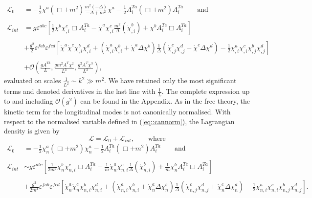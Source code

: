\documentclass{article}
\begin{document}
\begin{equation*}
    \begin{split}
        \mathcal{L}_0&=-\frac{1}{2}\chi^a(\Box+m^2)\frac{m^2(-\Delta)}{-\Delta+m^2}\chi^a-\frac{1}{2}A_i^{Ta}(\Box+m^2)A_i^{Ta}\qquad\text{and}\\\\
        \mathcal{L}_{int}&=g\varepsilon^{abc}\left[\frac{1}{2}\chi^b\chi^c_{,i}\Box A_i^{Ta}-\dot{\chi}^a\chi^{c}_{,i}\frac{m^2}{\Delta}\left(\dot{\chi}^b_{,i}\right)+\chi^bA_i^{Tc}\Box A_i^{Ta}\right]\\\\
        &+\frac{g^2}{2}\varepsilon^{fab}\varepsilon^{fcd}\left[\dot{\chi}^a\dot{\chi}^c\chi^b_{,i}\chi^{d}_{,i}+\left(\dot{\chi}^a_{,i}\chi^b_{,i}+\dot{\chi}^a\Delta\chi^b\right)\frac{1}{\Delta}\left(\dot{\chi}^c_{,j}\chi^d_{,j}+\dot{\chi}^c\Delta\chi^d\right)-\frac{1}{2}\chi^a_{,i}\chi^c_{,i}\chi^b_{,j}\chi^d_{,j}\right]\\\\
        &+\mathcal{O}\left(\frac{gA^{T3}}{L},\frac{gm^2A^T\chi^2}{L^3}, \frac{g^2A^T\chi^3}{L^3}\right),
    \end{split}
\end{equation*}
evaluated on scales $\frac{1}{L^2}\sim k^2\gg m^2$. We have retained only the most significant terms and denoted derivatives in the last line with $\frac{1}{L}$. The complete expression up to and including $\mathcal{O}\left(g^2\right)$ can be found in the Appendix. As in the free theory, the kinetic term for the longitudinal modes is not canonically normalised. With respect to the normalised variable defined in (\ref{eq::cannorm}), the Lagrangian density is given by
\begin{equation}\label{eq::Lnormlin}
    \mathcal{L}=\mathcal{L}_0+\mathcal{L}_{int},\qquad\text{where}
\end{equation}
\begin{equation*}
    \begin{split}
        \mathcal{L}_0&=-\frac{1}{2}\chi^a_n(\Box+m^2)\chi^a_n-\frac{1}{2}A_i^{Ta}(\Box+m^2)A_i^{Ta}\qquad\text{and}\\\\
        \mathcal{L}_{int}&\sim g\varepsilon^{abc}\left[\frac{1}{2m^2}\chi_n^b\chi^c_{n,i}\Box A_i^{Ta}-\frac{1}{m}\dot{\chi}_n^a\chi^{c}_{n,i}\frac{1}{\Delta}\left(\dot{\chi}^b_{n,i}\right)+\frac{1}{m}\chi_n^bA_i^{Tc}\Box A_i^{Ta}\right]\\\\
        &+\frac{g^2}{2m^4}\varepsilon^{fab}\varepsilon^{fcd}\left[\dot{\chi}_n^a\dot{\chi}_n^c\chi^b_{n,i}\chi^{d}_{n,i}+\left(\dot{\chi}^a_{n,i}\chi^b_{n,i}+\dot{\chi}_n^a\Delta\chi^b_n\right)\frac{1}{\Delta}\left(\dot{\chi}^c_{n,j}\chi^d_{n,j}+\dot{\chi}^c_n\Delta\chi^d_n\right)-\frac{1}{2}\chi^a_{n,i}\chi^c_{n,i}\chi^b_{n,j}\chi^d_{n,j}\right].
    \end{split}
\end{equation*}
\end{document}
